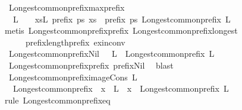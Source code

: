\begin{isabellebody}
\ Longest{\isacharunderscore}common{\isacharunderscore}prefix{\isacharunderscore}max{\isacharunderscore}prefix{\isacharcolon}\isanewline
\ \ {\isachardoublequoteopen}L\ {\isasymnoteq}\ {\isacharbraceleft}{\isacharbraceright}\ {\isasymLongrightarrow}\ {\isasymforall}xs{\isasymin}L{\isachardot}\ prefix\ ps\ xs\ {\isasymLongrightarrow}\ prefix\ ps\ {\isacharparenleft}Longest{\isacharunderscore}common{\isacharunderscore}prefix\ L{\isacharparenright}{\isachardoublequoteclose}\isanewline
%
\isadelimproof
%
\endisadelimproof
%
\isatagproof
{}\isamarkupfalse%
{\isacharparenleft}metis\ Longest{\isacharunderscore}common{\isacharunderscore}prefix{\isacharunderscore}prefix\ Longest{\isacharunderscore}common{\isacharunderscore}prefix{\isacharunderscore}longest\isanewline
\ \ \ \ \ prefix{\isacharunderscore}length{\isacharunderscore}prefix\ ex{\isacharunderscore}in{\isacharunderscore}conv{\isacharparenright}%
\endisatagproof
{\isafoldproof}%
%
\isadelimproof
\isanewline
%
\endisadelimproof
\isanewline
{}\isamarkupfalse%
\ Longest{\isacharunderscore}common{\isacharunderscore}prefix{\isacharunderscore}Nil{\isacharcolon}\ {\isachardoublequoteopen}{\isacharbrackleft}{\isacharbrackright}\ {\isasymin}\ L\ {\isasymLongrightarrow}\ Longest{\isacharunderscore}common{\isacharunderscore}prefix\ L\ {\isacharequal}\ {\isacharbrackleft}{\isacharbrackright}{\isachardoublequoteclose}\isanewline
%
\isadelimproof
%
\endisadelimproof
%
\isatagproof
{}\isamarkupfalse%
\ Longest{\isacharunderscore}common{\isacharunderscore}prefix{\isacharunderscore}prefix\ prefix{\isacharunderscore}Nil\ \isamarkupfalse%
\ blast%
\endisatagproof
{\isafoldproof}%
%
\isadelimproof
\isanewline
%
\endisadelimproof
\isanewline
{}\isamarkupfalse%
\ Longest{\isacharunderscore}common{\isacharunderscore}prefix{\isacharunderscore}image{\isacharunderscore}Cons{\isacharcolon}\ {\isachardoublequoteopen}L\ {\isasymnoteq}\ {\isacharbraceleft}{\isacharbraceright}\ {\isasymLongrightarrow}\isanewline
\ \ Longest{\isacharunderscore}common{\isacharunderscore}prefix\ {\isacharparenleft}{\isacharparenleft}{\isacharhash}{\isacharparenright}\ x\ {\isacharbackquote}\ L{\isacharparenright}\ {\isacharequal}\ x\ {\isacharhash}\ Longest{\isacharunderscore}common{\isacharunderscore}prefix\ L{\isachardoublequoteclose}\isanewline
%
\isadelimproof
%
\endisadelimproof
%
\isatagproof
{}\isamarkupfalse%
{\isacharparenleft}rule\ Longest{\isacharunderscore}common{\isacharunderscore}prefix{\isacharunderscore}eq{\isacharparenright}\isanewline
\ \ \isamarkupfalse%

\end{isabellebody}
